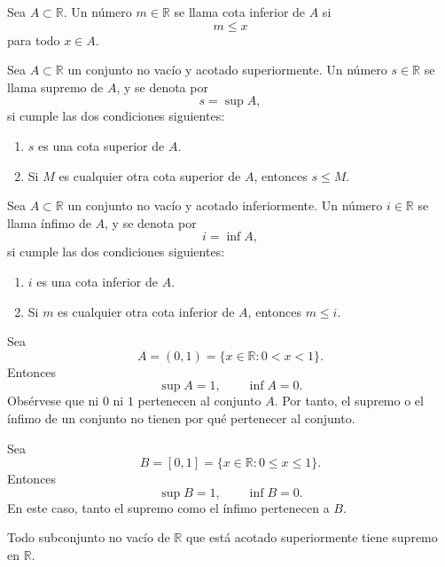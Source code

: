 \begin{definicion}
Sea \(A\subset\mathbb{R}\). Un n\'umero \(m\in\mathbb{R}\) se llama cota inferior de \(A\) si
\[
  m\leq x
\]
para todo \(x\in A\).
\end{definicion}

\begin{definicion}[Supremo]
Sea \(A\subset\mathbb{R}\) un conjunto no vac\'io y acotado superiormente. Un n\'umero \(s\in\mathbb{R}\) se llama supremo de \(A\), y se denota por
\[
  s=\sup A,
\]
si cumple las dos condiciones siguientes:
\begin{enumerate}
  \item \(s\) es una cota superior de \(A\).
  \item Si \(M\) es cualquier otra cota superior de \(A\), entonces \(s\leq M\).
\end{enumerate}
\end{definicion}

\begin{definicion}[\'Infimo]
Sea \(A\subset\mathbb{R}\) un conjunto no vac\'io y acotado inferiormente. Un n\'umero \(i\in\mathbb{R}\) se llama \'infimo de \(A\), y se denota por
\[
  i=\inf A,
\]
si cumple las dos condiciones siguientes:
\begin{enumerate}
  \item \(i\) es una cota inferior de \(A\).
  \item Si \(m\) es cualquier otra cota inferior de \(A\), entonces \(m\leq i\).
\end{enumerate}
\end{definicion}

\begin{ejemplo}
Sea
\[
  A=(0,1)=\{x\in\mathbb{R}:0<x<1\}.
\]
Entonces
\[
  \sup A=1,
  \qquad
  \inf A=0.
\]
Obs\'ervese que ni \(0\) ni \(1\) pertenecen al conjunto \(A\). Por tanto, el supremo o el \'infimo de un conjunto no tienen por qu\'e pertenecer al conjunto.
\end{ejemplo}

\begin{ejemplo}
Sea
\[
  B=[0,1]=\{x\in\mathbb{R}:0\leq x\leq 1\}.
\]
Entonces
\[
  \sup B=1,
  \qquad
  \inf B=0.
\]
En este caso, tanto el supremo como el \'infimo pertenecen a \(B\).
\end{ejemplo}

\begin{proposicion}
Todo subconjunto no vac\'io de \(\mathbb{R}\) que est\'a acotado superiormente tiene supremo en \(\mathbb{R}\).
\end{proposicion}

